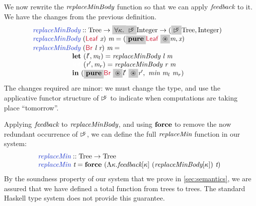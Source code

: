 We now rewrite the $\textit{replaceMinBody}$ function so that we can
apply $\textit{feedback}$ to it. We have  the
changes from the previous definition.
\begin{displaymath}
  \begin{array}{@{}l}
    \defn{replaceMinBody} :: \tyname{Tree} \to \hlchangem{\forall \kappa.}\hlchangem{\delay\kappa}\tyname{Integer} \to (\hlchangem{\delay\kappa}\tyname{Tree},\tyname{Integer}) \\
    \hspace{0cm} \defn{replaceMinBody}\ (\cons{Leaf}\ \ident{x})\ \ident{m} = (\hlchangem{\kw{pure}}\cons{Leaf}\ \hlchangem{\circledast}\ident{m}, \ident{x}) \\
    \hspace{0cm} \defn{replaceMinBody}\ (\cons{Br}\ \ident{l}\ \ident{r})\ \ident{m} = \\
    \hspace{2cm} \kw{let}\ (\ident{l$'$}, \ident{m$_l$}) = \ident{replaceMinBody}\ \ident{l}\ \ident{m} \\
    \hspace{2cm} \textcolor{white}{\kw{let}\ }(\ident{r$'$}, \ident{m$_r$}) = \ident{replaceMinBody}\ \ident{r}\ \ident{m} \\
    \hspace{2cm} \kw{in}\ (\hlchangem{\kw{pure}}\cons{Br}\ \hlchangem{\circledast}\ident{l$'$}\ \hlchangem{\circledast}\ident{r$'$},\ \ident{min}\ \ident{m$_l$}\ \ident{m$_r$})
  \end{array}
\end{displaymath}
The changes required are minor: we must change the type, and use the
applicative functor structure of $\mathord{\rhd\kern-0.4em^{\kappa}}$ to indicate when
computations are taking place ``tomorrow''.

Applying $\textit{feedback}$ to $\textit{replaceMinBody}$, and using
$\textbf{force}$ to remove the now redundant occurrence of $\mathord{\rhd\kern-0.4em^{\kappa}}$,
we can define the full $\textit{replaceMin}$ function in our system:
\begin{displaymath}
  \begin{array}{l}
    \defn{replaceMin} :: \tyname{Tree} \to \tyname{Tree} \\
    \defn{replaceMin}\ \ident{t} = \kw{force}\ (\Lambda \kappa. \ident{feedback}[\kappa]\ (\ident{replaceMinBody}[\kappa])\ \ident{t})
  \end{array}
\end{displaymath}
By the soundness property of our system that we prove in
\autoref{sec:semantics}, we are assured that we have defined a total
function from trees to trees. The standard Haskell type system does
not provide this guarantee.

